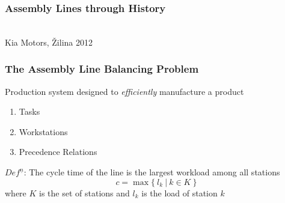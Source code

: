 \documentclass{beamer}
\begin{document}
\begin{frame}
\frametitle{Assembly Lines through History}
\centering
{}\\
Kia Motors, \v{Z}ilina 2012
\end{frame}

\begin{frame}
\frametitle{The Assembly Line Balancing Problem}
Production system designed to \emph{efficiently} manufacture a product\vspace{3mm}\pause	
\begin{enumerate}
	\item Tasks \vspace{2mm}
	\item Workstations\vspace{2mm}
	\item Precedence Relations\pause
\end{enumerate}
\vspace{4mm}
$Def^{\underline{n}}$: The {\color{red} cycle time} of the line is
the largest workload among all stations
\[ c = \max\{\: l_k \: | \: k\in K\:\} \]
	where $K$ is the set of stations and $l_k$ is the load of station $k$
\end{frame}
\end{document}
